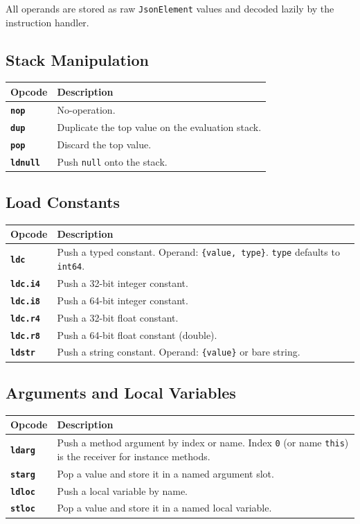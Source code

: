 \documentclass[11pt,a4paper]{article}
\newcommand{\code}[1]{\texttt{\small #1}}
\newcommand{\typename}[1]{\textcolor{typecolor}{\texttt{\small #1}}}
\newcommand{\opcode}[1]{\textbf{\texttt{#1}}}
\begin{document}
All operands are stored as raw \typename{JsonElement} values and decoded
lazily by the instruction handler.

\subsection{Stack Manipulation}

\begin{longtable}{lp{10cm}}
  \toprule
  \textbf{Opcode} & \textbf{Description} \\
  \midrule
  \endhead
  \opcode{nop}    & No-operation. \\
  \opcode{dup}    & Duplicate the top value on the evaluation stack. \\
  \opcode{pop}    & Discard the top value. \\
  \opcode{ldnull} & Push \texttt{null} onto the stack. \\
  \bottomrule
\end{longtable}

\subsection{Load Constants}

\begin{longtable}{lp{10cm}}
  \toprule
  \textbf{Opcode} & \textbf{Description} \\
  \midrule
  \endhead
  \opcode{ldc}    & Push a typed constant. Operand: \code{\{value, type\}}. \texttt{type}
                    defaults to \texttt{int64}. \\
  \opcode{ldc.i4} & Push a 32-bit integer constant. \\
  \opcode{ldc.i8} & Push a 64-bit integer constant. \\
  \opcode{ldc.r4} & Push a 32-bit float constant. \\
  \opcode{ldc.r8} & Push a 64-bit float constant (double). \\
  \opcode{ldstr}  & Push a string constant. Operand: \code{\{value\}} or bare string. \\
  \bottomrule
\end{longtable}

\subsection{Arguments and Local Variables}

\begin{longtable}{lp{10cm}}
  \toprule
  \textbf{Opcode} & \textbf{Description} \\
  \midrule
  \endhead
  \opcode{ldarg}  & Push a method argument by index or name. Index \texttt{0} (or name
                    \texttt{this}) is the receiver for instance methods. \\
  \opcode{starg}  & Pop a value and store it in a named argument slot. \\
  \opcode{ldloc}  & Push a local variable by name. \\
  \opcode{stloc}  & Pop a value and store it in a named local variable. \\
  \bottomrule
\end{longtable}
\end{document}
